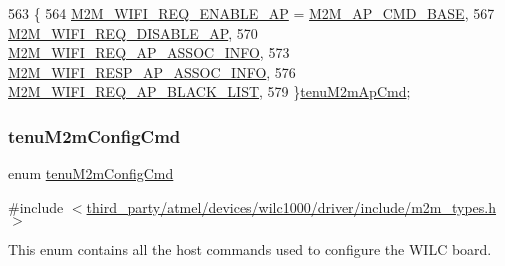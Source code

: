 \begin{DoxyCode}
563              \{
564     \hyperlink{group__WlanEnums_ggaa62989ea5e2977b374a04db81c89d524aea60fb0c4912ce9ead2d776c19b4434f}{M2M\_WIFI\_REQ\_ENABLE\_AP} = \hyperlink{group__WlanDefines_gaf6815531611fc48229339c543f369a11}{M2M\_AP\_CMD\_BASE},
567     \hyperlink{group__WlanEnums_ggaa62989ea5e2977b374a04db81c89d524a472b080df0dcfd0cc31d9299c252ef38}{M2M\_WIFI\_REQ\_DISABLE\_AP},
570     \hyperlink{group__WlanEnums_ggaa62989ea5e2977b374a04db81c89d524a29641c61a3ed08222ca65a14bf2c2f24}{M2M\_WIFI\_REQ\_AP\_ASSOC\_INFO},
573     \hyperlink{group__WlanEnums_ggaa62989ea5e2977b374a04db81c89d524ae44909b7e419ce7c69f64ab8399ea67d}{M2M\_WIFI\_RESP\_AP\_ASSOC\_INFO},
576     \hyperlink{group__WlanEnums_ggaa62989ea5e2977b374a04db81c89d524adb0a42de9451d51642d7269fea6fce9a}{M2M\_WIFI\_REQ\_AP\_BLACK\_LIST},
579 \}\hyperlink{group__WlanEnums_gaa62989ea5e2977b374a04db81c89d524}{tenuM2mApCmd};
\end{DoxyCode}
\mbox{\label{group__WlanEnums_ga57466b36df595c593e7ccc9892e14b20}} 
\subsubsection{\texorpdfstring{tenu\+M2m\+Config\+Cmd}{tenuM2mConfigCmd}}
{\footnotesize\ttfamily enum \hyperlink{group__WlanEnums_ga57466b36df595c593e7ccc9892e14b20}{tenu\+M2m\+Config\+Cmd}}



{\ttfamily \#include $<$\hyperlink{m2m__types_8h}{third\+\_\+party/atmel/devices/wilc1000/driver/include/m2m\+\_\+types.\+h}$>$}



This enum contains all the host commands used to configure the W\+I\+LC board. 

